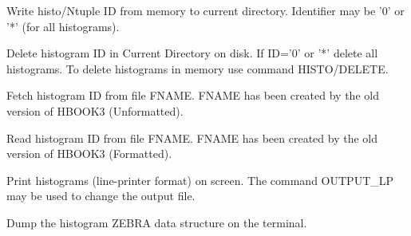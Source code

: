    \par
Write histo/Ntuple ID from memory to current directory.  Identifier may be 
   '0' or '*' (for all histograms).  

\ENDCMD


\BEGARG
{}
\ENDARG

   \par
Delete histogram ID in Current Directory on disk.  If ID='0' or '*' delete 
   all histograms.  To delete histograms in memory use command HISTO/DELETE.  

\ENDCMD


\BEGARG
{}
\ENDARG

   \par
Fetch histogram ID from file FNAME.  FNAME has been created by the old 
   version of HBOOK3 (Unformatted).  

\ENDCMD


\BEGARG
{}
\ENDARG

   \par
Read histogram ID from file FNAME.  FNAME has been created by the old 
   version of HBOOK3 (Formatted).  

\ENDCMD


\BEGARG
{}
\ENDARG
{}
\ENDOPT

   \par
Print histograms (line-printer format) on screen.  The command OUTPUT\_LP 
   may be used to change the output file.  

\ENDCMD


\BEGARG
{}
\ENDARG

   \par
Dump the histogram ZEBRA data structure on the terminal.  

